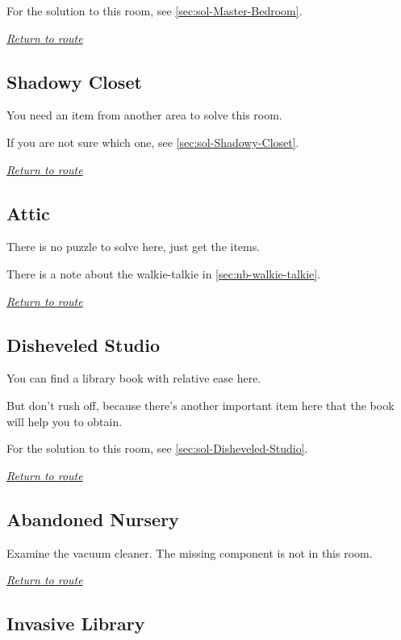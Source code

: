 \documentclass[a5paper]{extarticle}
\begin{document}
For the solution to this room, see \cref{sec:sol-Master-Bedroom}.

\hyperref[sec:route-9]{\emph{Return to route}}

\newpage
\subsection{Shadowy Closet}\label{sec:req-Shadowy-Closet}

You need an item from another area to solve this room.

If you are not sure which one, see \cref{sec:sol-Shadowy-Closet}.

\hyperref[sec:route-9]{\emph{Return to route}}

\newpage
\subsection{Attic}\label{sec:req-Attic}

There is no puzzle to solve here, just get the items.

There is a note about the walkie-talkie in \cref{sec:nb-walkie-talkie}.

\hyperref[sec:route-10]{\emph{Return to route}}

\newpage
\subsection{Disheveled Studio}\label{sec:req-Disheveled-Studio}

You can find a library book with relative ease here.

But don't rush off, because there's another important item here that the book will help you to obtain.

For the solution to this room, see \cref{sec:sol-Disheveled-Studio}.

\hyperref[sec:route-10]{\emph{Return to route}}

\newpage
\subsection{Abandoned Nursery}\label{sec:req-Abandoned-Nursery-0}

Examine the vacuum cleaner. The missing component is not in this room.

\hyperref[sec:route-10]{\emph{Return to route}}

\newpage
\subsection{Invasive Library}\label{sec:req-Invasive-Library}
\end{document}
